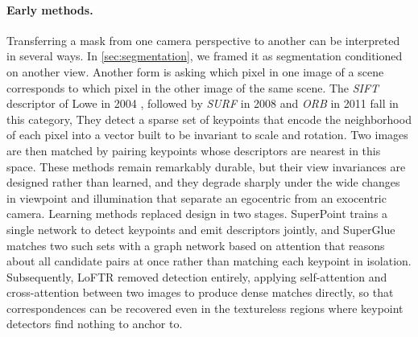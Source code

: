 \paragraph{Early methods.} Transferring a mask from one camera perspective to another can be interpreted in several ways. In \cref{sec:segmentation}, we framed it as segmentation conditioned  on another view. Another form is asking which pixel in one image of a scene corresponds to which pixel in the other image of the same scene. The \textit{SIFT} descriptor of Lowe in 2004 \cite{lowe2004sift}, followed by \textit{SURF} \cite{bay2008surf} in 2008 and \textit{ORB} \cite{rublee2011orb} in 2011 fall in this category, They detect a sparse set of keypoints that encode the neighborhood of each pixel into a vector built to be invariant to scale and rotation. Two images are then matched by pairing keypoints whose descriptors are nearest in this space. These methods remain remarkably durable, but their view invariances are designed rather than learned, and they degrade sharply under the wide changes in viewpoint and illumination that separate an egocentric from an exocentric camera. Learning methods replaced design in two stages. SuperPoint \cite{detone2018superpoint} trains a single network to detect keypoints and emit descriptors jointly, and SuperGlue \cite{sarlin2020superglue} matches two such sets with a graph network based on attention that reasons about all candidate pairs at once rather than matching each keypoint in isolation. Subsequently, LoFTR \cite{sun2021loftr}  removed detection entirely, applying  self-attention and cross-attention between two images to produce dense matches directly, so that correspondences can be recovered even in the textureless regions where keypoint detectors find nothing to anchor to.

